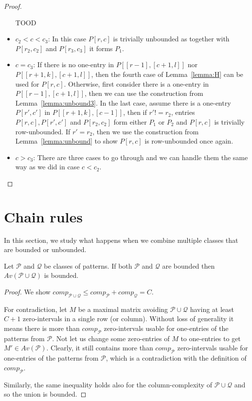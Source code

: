 \begin{proof}
\begin{itemize}
	TOOD
	\item $c_2<c<c_3$: In this case $P[r,c]$ is trivially unbounded as together with $P[r_2,c_2]$ and $P[r_3,c_3]$ it forms $P_1$.
	\item $c=c_3$: If there is no one-entry in $P[[r-1],[c+1,l]]$ nor $P[[r+1,k],[c+1,l]]$, then the fourth case of Lemma~\ref{lemma:H} can be used for $P[r,c]$. Otherwise, first consider there is a one-entry in $P[[r-1],[c+1,l]]$, then we can use the construction from Lemma~\ref{lemma:unbound3}. In the last case, assume there is a one-entry $P[r',c']$ in $P[[r+1,k],[c-1]]$, then if $r'!=r_2$, entries $P[r,c],P[r',c']$ and $P[r_2,c_2]$ form either $P_1$ or $P_2$ and $P[r,c]$ is trivially row-unbounded. If $r'=r_2$, then we use the construction from Lemma~\ref{lemma:unbound} to show $P[r,c]$ is row-unbounded once again.
	\item $c>c_3$: There are three cases to go through and we can handle them the same way as we did in case $c<c_2$.
\end{itemize}
\end{proof}

\section{Chain rules}
In this section, we study what happens when we combine multiple classes that are bounded or unbounded.

\begin{thm}
\label{thm:boundunion}
Let $\mathcal{P}$ and $\mathcal{Q}$ be classes of patterns. If both $\mathcal{P}$ and $\mathcal{Q}$ are bounded then $Av(\mathcal{P}\cup\mathcal{Q})$ is bounded.
\end{thm}
\begin{proof}
We show $comp_{\mathcal{P}\cup\mathcal{Q}}\leq comp_\mathcal{P}+comp_\mathcal{Q}=C$.

For contradiction, let $M$ be a maximal matrix avoiding $\mathcal{P}\cup\mathcal{Q}$ having at least $C+1$ zero-intervals in a single row (or column). Without loss of generality it means there is more than $comp_\mathcal{P}$ zero-intervals usable for one-entries of the patterns from $\mathcal{P}$. Not let us change some zero-entries of $M$ to one-entries to get $M'\in Av(\mathcal{P})$. Clearly, it still contains more than $comp_\mathcal{P}$ zero-intervals usable for one-entries of the patterns from $\mathcal{P}$, which is a contradiction with the definition of $comp_\mathcal{P}$.

Similarly, the same inequality holds also for the column-complexity of $\mathcal{P}\cup\mathcal{Q}$ and so the union is bounded.
\end{proof}


